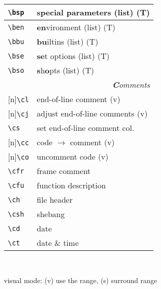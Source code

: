 \documentclass[oneside,11pt,landscape,DIV16]{scrartcl}
\newcommand{\Rep}{{\scriptsize{[n]}}}
\begin{document}
\begin{multicols}{3}
\begin{center}
\begin{tabular}[]{|p{11mm}|p{60mm}|}
\hline \verb'\bsp'   & \textbf{s}pecial \textbf{p}arameters (list)     \hfill (T)\\
\hline \verb'\ben'   & \textbf{en}vironment (list)                     \hfill (T)\\
\hline \verb'\bbu'   & \textbf{bu}iltins (list)                        \hfill (T)\\
\hline \verb'\bse'   & \textbf{se}t options (list)                     \hfill (T)\\
\hline \verb'\bso'   & \textbf{s}h\textbf{o}pts (list)                 \hfill (T)\\
\hline 
\hline
\multicolumn{2}{|r|}{\textsl{\textbf{C}omments}}                       \\[1.0ex]
\hline \Rep\verb'\cl'   & end-of-line comment               \hfill (v)\\
\hline \Rep\verb'\cj'   & adjust end-of-line comments       \hfill (v)\\
\hline     \verb'\cs'   & set end-of-line comment col.      \\
%
\hline \Rep\verb'\cc'   & code $\rightarrow$ comment        \hfill (v)\\
\hline \Rep\verb'\co'   & uncomment code                    \hfill (v)\\
%
\hline     \verb'\cfr'  & frame comment                     \\
\hline     \verb'\cfu'  & function description              \\
\hline     \verb'\ch'   & file header                       \\
\hline     \verb'\csh'  & shebang                           \\
\hline     \verb'\cd'   & date                              \\
\hline     \verb'\ct'   & date \& time                      \\
\hline
\end{tabular}\\[1.0ex]
%
\begin{minipage}[b]{72mm}%
\scriptsize{%
visual mode: {\normalsize (v)} use the range, 
{\normalsize (s)} surround range \\
}
\end{minipage}
\end{center}
\end{multicols}
\end{document}
